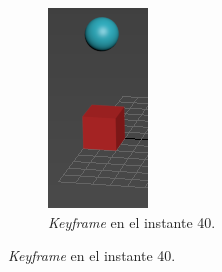 \documentclass{article}
\begin{document}
\begin{figure}[H]
	\begin{subfigure}[H]{0.15\textwidth}
	    \centering
	    \includegraphics[width=\textwidth]{imagenes/Ejercicio 1/p1_ins40.png}
	    \caption{\textit{Keyframe} en el instante 40.}

\end{subfigure}
\end{figure}
\end{document}
